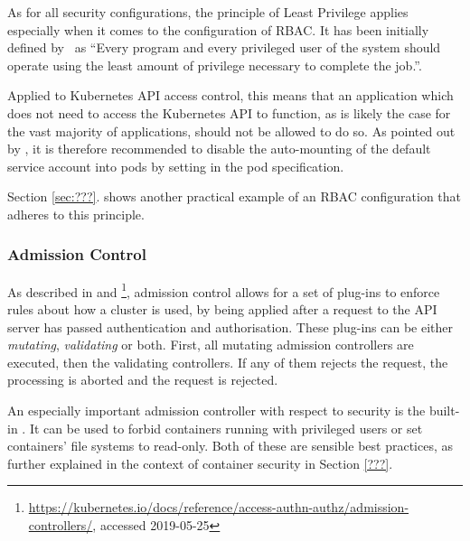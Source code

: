 As for all security configurations, the principle of Least Privilege applies especially when it comes to the configuration of \ac{RBAC}. It has been initially defined by~\textcite{leastPrivilege} as \enquote{Every program and every privileged user of the system should operate using the least amount of privilege necessary to complete the job.}. 

Applied to Kubernetes API access control, this means that an application which does not need to access the Kubernetes API to function, as is likely the case for the vast majority of applications, should not be allowed to do so. As pointed out by \textcite{kubernetessecurity}, it is therefore recommended to disable the auto-mounting of the default service account into pods by setting  in the pod specification. 



Section \ref{sec:???}. shows another practical example of an \ac{RBAC} configuration that adheres to this principle.



\subsubsection{Admission Control} \label{admissionControl}

As described in \cite{admissionControl} and \cite{k8sdocs}\footnote{\url{https://kubernetes.io/docs/reference/access-authn-authz/admission-controllers/}, accessed 2019-05-25}, admission control allows for a set of plug-ins to enforce rules about how a cluster is used, by being applied after a request to the API server has passed authentication and authorisation. These plug-ins can be either \textit{mutating}, \textit{validating} or both. First, all mutating admission controllers are executed, then the validating controllers. If any of them rejects the request, the processing is aborted and the request is rejected.

An especially important admission controller with respect to security is the built-in . It can be used to forbid containers running with privileged users or set containers' file systems to read-only. Both of these are sensible best practices, as further explained in the context of container security in Section \ref{???}. %

